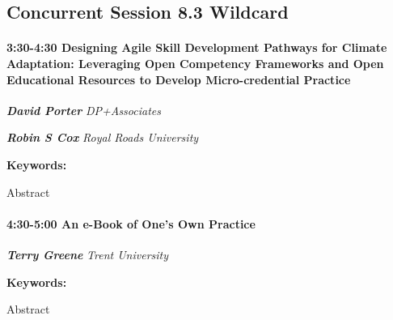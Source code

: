 \documentclass[
]{book}
\begin{document}
\hypertarget{concurrent-session-8.3-wildcard}{%
\subsection*{Concurrent Session 8.3 \textbar{} Wildcard}\label{concurrent-session-8.3-wildcard}}

\begin{session}
\hypertarget{designing-agile-skill-development-pathways-for-climate-adaptation-leveraging-open-competency-frameworks-and-open-educational-resources-to-develop-micro-credential-practice}{%
\paragraph*{\texorpdfstring{3:30-4:30 \textbar{} \textbf{Designing Agile
Skill Development Pathways for Climate Adaptation: Leveraging Open
Competency Frameworks and Open Educational Resources to Develop
Micro-credential} \textbar{}
Practice}{3:30-4:30 \textbar{} Designing Agile Skill Development Pathways for Climate Adaptation: Leveraging Open Competency Frameworks and Open Educational Resources to Develop Micro-credential \textbar{} Practice}}\label{designing-agile-skill-development-pathways-for-climate-adaptation-leveraging-open-competency-frameworks-and-open-educational-resources-to-develop-micro-credential-practice}}

\textbf{\emph{David Porter}} \textbar{} \emph{DP+Associates}

\textbf{\emph{Robin S Cox}} \textbar{} \emph{Royal Roads University}

\textbf{Keywords:}

Abstract
\end{session}

\begin{session}
\hypertarget{an-e-book-of-ones-own-practice}{%
\paragraph*{\texorpdfstring{4:30-5:00 \textbar{} \textbf{An e-Book of
One's Own} \textbar{}
Practice}{4:30-5:00 \textbar{} An e-Book of One's Own \textbar{} Practice}}\label{an-e-book-of-ones-own-practice}}

\textbf{\emph{Terry Greene}} \textbar{} \emph{Trent University}

\textbf{Keywords:}

Abstract
\end{session}
\end{document}
